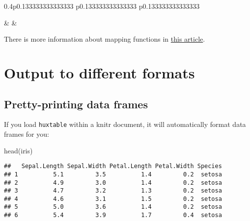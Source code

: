 \documentclass[
]{article}
\newenvironment{Shaded}{\begin{snugshade}}{\end{snugshade}}
\newcommand{\FunctionTok}[1]{\textcolor[rgb]{0.00,0.00,0.00}{#1}}
\newcommand{\NormalTok}[1]{#1}
\begin{document}
\begin{table}[ht]
\begin{centerbox}
\begin{threeparttable}
\begin{tabularx}{0.4\textwidth}{p{} p{} p{}}
\hhline{}

 &
 &
 \tabularnewline[-0.5pt]


\hhline{}
\end{tabularx}
\end{threeparttable}\par\end{centerbox}

\end{table}
 

\FloatBarrier

There is more information about mapping functions in
\href{https://hughjonesd.github.io/reporting-data-with-huxtable-4.3.0.html}{this
article}.

\hypertarget{output-to-different-formats}{%
\section{Output to different
formats}\label{output-to-different-formats}}

\hypertarget{pretty-printing-data-frames}{%
\subsection{Pretty-printing data
frames}\label{pretty-printing-data-frames}}

If you load \texttt{huxtable} within a knitr document, it will
automatically format data frames for you:

\begin{Shaded}
\begin{Highlighting}[]
\FunctionTok{head}\NormalTok{(iris)}
\end{Highlighting}
\end{Shaded}

\begin{verbatim}
##   Sepal.Length Sepal.Width Petal.Length Petal.Width Species
## 1          5.1         3.5          1.4         0.2  setosa
## 2          4.9         3.0          1.4         0.2  setosa
## 3          4.7         3.2          1.3         0.2  setosa
## 4          4.6         3.1          1.5         0.2  setosa
## 5          5.0         3.6          1.4         0.2  setosa
## 6          5.4         3.9          1.7         0.4  setosa
\end{verbatim}
\end{document}

